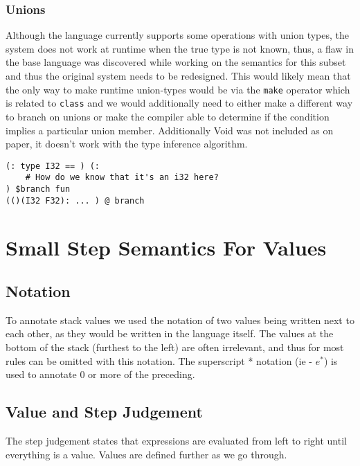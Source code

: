\documentclass[acmsmall, review]{acmart}
\theoremstyle{definition}
\begin{document}
\subsubsection{Unions}
Although the language currently supports some operations with union types,
the system does not work at runtime when the true type is not known, thus,
a flaw in the base language was discovered while working on the semantics
for this subset and thus the original system needs to be redesigned. This
would likely mean that the only way to make runtime union-types would be
via the \texttt{make} operator which is related to \texttt{class} and we
would additionally need to either make a different way to branch on unions
or make the compiler able to determine if the condition implies a particular
union member. Additionally Void was not included as on paper, it doesn't
work with the type inference algorithm.

\begin{verbatim}
(: type I32 == ) (: 
    # How do we know that it's an i32 here?
) $branch fun
(()(I32 F32): ... ) @ branch
\end{verbatim}

\section{Small Step Semantics For Values}
\subsection{Notation}
To annotate stack values we used the notation of two values being written next to each other, as they would be written in the language itself. The values at the bottom of the stack (furthest to the left) are often irrelevant, and thus for most rules can be omitted with this notation. The superscript * notation (ie - $e^*$) is used to annotate 0 or more of the preceding.

\subsection{Value and Step Judgement}
The step judgement states that expressions are evaluated from left to right until everything is a value. Values are defined further as we go through.
{
    \centering
    \def \MathparLineskip {\lineskip=0.43cm}
}
\end{document}
